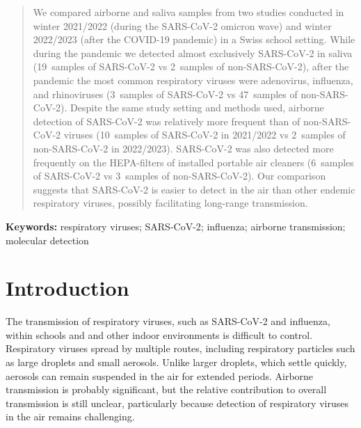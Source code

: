 \documentclass[fleqn,11pt]{wlscirep}
\begin{document}
\begin{abstract}\normalfont
\noindent We compared airborne and saliva samples from two studies conducted in winter 2021/2022 (during the SARS-CoV-2 omicron wave) and winter 2022/2023 (after the COVID-19 pandemic) in a Swiss school setting. While during the pandemic we detected almost exclusively SARS-CoV-2 in saliva (19~samples of SARS-CoV-2 vs 2~samples of non-SARS-CoV-2), after the pandemic the most common respiratory viruses were adenovirus, influenza, and rhinoviruses (3~samples of SARS-CoV-2 vs 47~samples of non-SARS-CoV-2). Despite the same study setting and methods used, airborne detection of SARS-CoV-2 was relatively more frequent than of non-SARS-CoV-2 viruses (10~samples of SARS-CoV-2 in 2021/2022 vs 2~samples of non-SARS-CoV-2 in 2022/2023). SARS-CoV-2 was also detected more frequently on the HEPA-filters of installed portable air cleaners (6~samples of SARS-CoV-2 vs 3~samples of non-SARS-CoV-2). Our comparison suggests that SARS-CoV-2 is easier to detect in the air than other endemic respiratory viruses, possibly facilitating long-range transmission. \medskip

\par
\end{abstract}

\flushbottom
\maketitle

\vspace{2em}

\vspace{0.5em}

\noindent\textbf{Keywords:} respiratory viruses; SARS-CoV-2; influenza; airborne transmission; molecular detection

\thispagestyle{empty}
\sloppy
\raggedbottom

\newpage

\setcounter{page}{1}

\section*{Introduction}

The transmission of respiratory viruses, such as SARS-CoV-2 and influenza, within schools and and other indoor environments is difficult to control\cite{Leung2020}. Respiratory viruses spread by multiple routes, including respiratory particles such as large droplets and small aerosols. Unlike larger droplets, which settle quickly, aerosols can remain suspended in the air for extended periods\cite{Wang2021}. Airborne transmission is probably significant, but the relative contribution to overall transmission is still unclear, particularly because detection of respiratory viruses in the air remains challenging\cite{Belser2023PLOSPath}.
\end{document}
